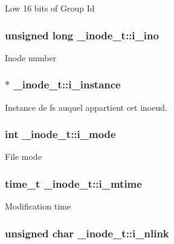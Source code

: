 Low 16 bits of Group Id \hypertarget{struct__inode__t_aba602b843ba63a32ca3950dbaf7e959c}{
\subsubsection[{i\-\_\-ino}]{\setlength{\rightskip}{0pt plus 5cm}unsigned long \-\_\-inode\-\_\-t\-::i\-\_\-ino}}\label{struct__inode__t_aba602b843ba63a32ca3950dbaf7e959c}
Inode number \hypertarget{struct__inode__t_affefc88b22f45e2ec8340d582486d0f2}{
\subsubsection[{i\-\_\-instance}]{$\ast$ \-\_\-inode\-\_\-t\-::i\-\_\-instance}}\label{struct__inode__t_affefc88b22f45e2ec8340d582486d0f2}
Instance de fs auquel appartient cet inoeud. \hypertarget{struct__inode__t_acead4732b6c22ef17ada59203509e728}{
\subsubsection[{i\-\_\-mode}]{\setlength{\rightskip}{0pt plus 5cm}int \-\_\-inode\-\_\-t\-::i\-\_\-mode}}\label{struct__inode__t_acead4732b6c22ef17ada59203509e728}
File mode \hypertarget{struct__inode__t_a331d724391efce2f89aeb1a503ae5c43}{
\subsubsection[{i\-\_\-mtime}]{\setlength{\rightskip}{0pt plus 5cm}time\-\_\-t \-\_\-inode\-\_\-t\-::i\-\_\-mtime}}\label{struct__inode__t_a331d724391efce2f89aeb1a503ae5c43}
Modification time \hypertarget{struct__inode__t_a929fc1e6837d02a2525027a121b4e67e}{
\subsubsection[{i\-\_\-nlink}]{\setlength{\rightskip}{0pt plus 5cm}unsigned char \-\_\-inode\-\_\-t\-::i\-\_\-nlink}}\label{struct__inode__t_a929fc1e6837d02a2525027a121b4e67e}
